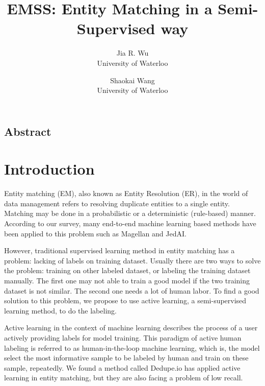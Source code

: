 \documentclass[letterpaper,twocolumn,10pt]{article}
\begin{document}
\date{}

\title{\Large \bf EMSS: Entity Matching in a Semi-Supervised way}




\author{
{\rm Jia R. Wu}\\
University of Waterloo
\and
{\rm Shaokai Wang}\\
University of Waterloo
} %

\maketitle

\thispagestyle{empty}


\subsection*{Abstract}



\section{Introduction}
Entity matching (EM), also known as Entity Resolution (ER), in the world of data management refers to resolving duplicate entities to a single entity. Matching may be done in a probabilistic or a deterministic (rule-based) manner. According to our survey, many end-to-end machine learning based methods have been applied to this problem such as Magellan and JedAI.

However, traditional supervised learning method in entity matching has a problem: lacking of labels on training dataset. Usually there are two ways to solve the problem: training on other labeled dataset, or labeling the training dataset manually. The first one may not able to train a good model if the two training dataset is not similar. The second one needs a lot of human labor. To find a good solution to this problem, we propose to use active learning, a semi-supervised learning method, to do the labeling.

Active learning in the context of machine learning describes the process of a user actively providing labels for model training. This paradigm of active human labeling is referred to as human-in-the-loop machine learning, which is, the model select the most informative sample to be labeled by human and train on these sample, repeatedly. We found a method called Dedupe.io has applied active learning in entity matching, but they are also facing a problem of low recall.
\end{document}
